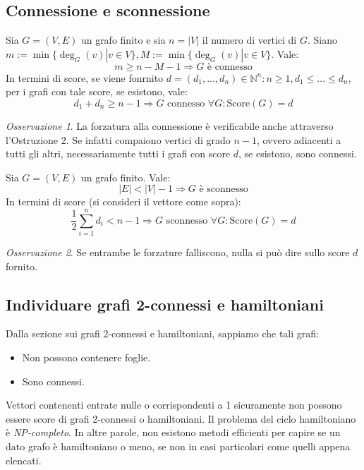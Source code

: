 \documentclass[oneside]{book}
\theoremstyle{remark}
\newtheorem*{osservaz}{Osservazione}
\begin{document}
\subsection*{Connessione e sconnessione}
\begin{tcolorbox}[colback=red!30, colframe=red!30!black, title=Forzatura alla connessione]
Sia $G=(V,E)$ un grafo  finito e sia $n=|V|$ il numero
di vertici di $G$. Siano $m:=\min\{\deg_G(v)|v\in V\},
M:=\min\{\deg_G(v)|v\in V\}$. Vale:
\[ m\geq n-M-1 \Longrightarrow G \text{ è connesso} \]
In termini di score, se viene fonrnito $d=(d_1,...,d_n)\in\mathbb{N}^n:
n\geq1, d_1\leq...\leq d_n$, per i grafi con tale score, se
esistono, vale:
\[ d_1+d_n \geq n-1 \Longrightarrow G\text{ connesso }\forall G:\text{Score}(G)=d \]
\end{tcolorbox}
\begin{osservaz}
La forzatura alla connessione è verificabile
anche attraverso l'Ostruzione 2. Se infatti compaiono vertici di grado
$n-1$, ovvero adiacenti a tutti gli altri, necessariamente tutti i
grafi con score $d$, se esistono, sono connessi.
\end{osservaz}

\begin{tcolorbox}[colback=red!30, colframe=red!30!black, title=Forzatura alla sconnessione]
Sia $G=(V,E)$ un grafo finito. Vale:
\[ |E|<|V|-1 \Longrightarrow G \text{ è sconnesso} \]
In termini di score (si consideri il vettore come sopra):
\[ \frac12\sum_{i=1}^{n}d_i < n-1 \Longrightarrow G\text{ sconnesso } \forall G:\text{Score}(G)=d \]
\end{tcolorbox}
\begin{osservaz}
Se entrambe le forzature falliscono, nulla si può dire sullo score $d$ fornito.
\end{osservaz}

\subsection*{Individuare grafi 2-connessi e hamiltoniani}
\noindent Dalla sezione sui grafi 2-connessi e hamiltoniani, sappiamo che tali
grafi:
\begin{itemize}
\item Non possono contenere foglie.
\item Sono connessi.
\end{itemize}
Vettori contenenti entrate nulle o corrispondenti a 1 sicuramente
non possono essere score di grafi 2-connessi o hamiltoniani.
Il problema del ciclo hamiltoniano è \textit{NP-completo}. In altre
parole, non esistono metodi efficienti per capire se un dato grafo
è hamiltoniano o meno, se non in casi particolari come quelli appena
elencati.
\end{document}

